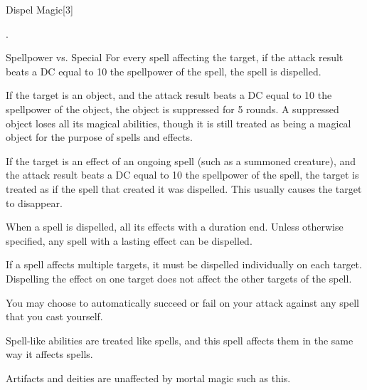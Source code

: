 \begin{spellsection}{Dispel Magic}[3]
    \begin{spellheader}
        .
    \end{spellheader}
    \begin{spellcontent}
        \begin{spelltargetinginfo}
        \end{spelltargetinginfo}
        \begin{spelleffects}
            \begin{spellattack}{Spellpower vs. Special}
                \spelleffect For every spell affecting the target, if the attack result beats a DC equal to 10 \add the spellpower of the spell, the spell is dispelled.

                If the target is an object, and the attack result beats a DC equal to 10 \add the spellpower of the object, the object is suppressed for 5 rounds. A suppressed object loses all its magical abilities, though it is still treated as being a magical object for the purpose of spells and effects.

                If the target is an effect of an ongoing spell (such as a summoned creature), and the attack result beats a DC equal to 10 \add the spellpower of the spell, the target is treated as if the spell that created it was dispelled. This usually causes the target to disappear.
            \end{spellattack}
        \end{spelleffects}
    \end{spellcontent}
    \begin{spellfooter}
        \spellnotes When a spell is dispelled, all its effects with a duration end. Unless otherwise specified, any spell with a lasting effect can be dispelled.

        If a spell affects multiple targets, it must be dispelled individually on each target. Dispelling the effect on one target does not affect the other targets of the spell.

        You may choose to automatically succeed or fail on your attack against any spell that you cast yourself.

        Spell-like abilities are treated like spells, and this spell affects them in the same way it affects spells.

        Artifacts and deities are unaffected by mortal magic such as this.
        \miscastrandom
    \end{spellfooter}
\end{spellsection}

